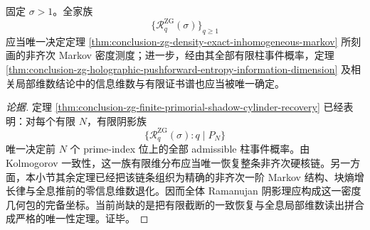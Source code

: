 \begin{conjecture}\label{conj:conclusion-zg-ramanujan-shadow-markov-dimension-completeness}
固定 \(\sigma>1\)。全家族
\[
\{\mathcal R_q^{\mathrm{ZG}}(\sigma)\}_{q\ge 1}
\]
应当唯一决定定理 \ref{thm:conclusion-zg-density-exact-inhomogeneous-markov} 所刻画的非齐次 Markov 密度测度；进一步，经由其全部有限柱事件概率，定理 \ref{thm:conclusion-zg-holographic-pushforward-entropy-information-dimension} 及相关局部维数结论中的信息维数与有限证书谱也应当被唯一确定。
\end{conjecture}
\begin{proof}[论据]
定理 \ref{thm:conclusion-zg-finite-primorial-shadow-cylinder-recovery} 已经表明：对每个有限 \(N\)，有限阴影族
\[
\{\mathcal R_q^{\mathrm{ZG}}(\sigma):q\mid P_N\}
\]
唯一决定前 \(N\) 个 prime-index 位上的全部 admissible 柱事件概率。由 Kolmogorov 一致性，这一族有限维分布应当唯一恢复整条非齐次硬核链。另一方面，本小节其余定理已经把该链条组织为精确的非齐次一阶 Markov 结构、块熵增长律与全息推前的零信息维数退化。因而全体 Ramanujan 阴影理应构成这一密度几何包的完备坐标。当前尚缺的是把有限截断的一致恢复与全息局部维数读出拼合成严格的唯一性定理。证毕。
\end{proof}
